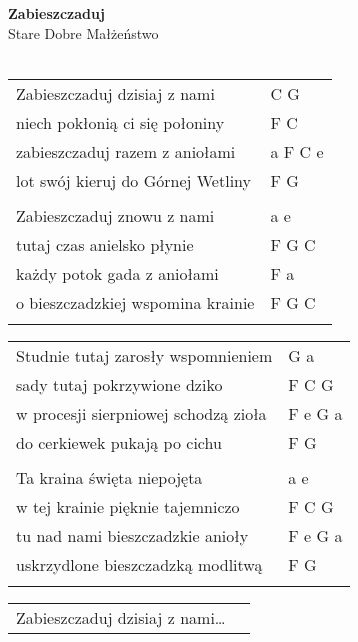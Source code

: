 \documentclass[a5paper]{article}
\begin{document}


\noindent
\fontsize{12pt}{15pt}\selectfont
\textbf{Zabieszczaduj} \\
\fontsize{8pt}{10pt}\selectfont
Stare Dobre Małżeństwo \\ \\
\fontsize{10pt}{12pt}\selectfont

\begin{tabular}{@{}p{7.00cm}p{3cm}@{}}
\noindent
Zabieszczaduj dzisiaj z nami & C G \\
niech pokłonią ci się połoniny & F C \\
zabieszczaduj razem z aniołami & a F C e \\
lot swój kieruj do Górnej Wetliny & F G \\ \\

Zabieszczaduj znowu z nami & a e \\
tutaj czas anielsko płynie & F G C \\
każdy potok gada z aniołami & F a \\
o bieszczadzkiej wspomina krainie & F G C \\ \\
\end{tabular}

\noindent
\begin{tabular}{@{}p{8.00cm}p{3cm}@{}}
Studnie tutaj zarosły wspomnieniem & G a \\
sady tutaj pokrzywione dziko & F C G \\
w procesji sierpniowej schodzą zioła & F e G a \\
do cerkiewek pukają po cichu & F G \\ \\

Ta kraina święta niepojęta & a e \\
w tej krainie pięknie tajemniczo & F C G \\
tu nad nami bieszczadzkie anioły & F e G a \\
uskrzydlone bieszczadzką modlitwą & F G \\ \\
\end{tabular}

\noindent
\begin{tabular}{@{}p{7.00cm}p{3cm}@{}}
Zabieszczaduj dzisiaj z nami… 
\end{tabular}
\end{document}
